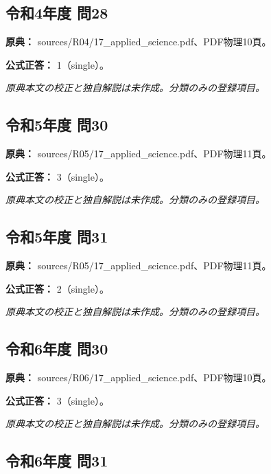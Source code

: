\subsection{令和4年度 問28}
\label{q:r04-reg-applied-28}

\noindent\textbf{原典：} sources/R04/17\_applied\_science.pdf、PDF物理10頁。

\textbf{公式正答：} 1（single）。

\par\textit{原典本文の校正と独自解説は未作成。分類のみの登録項目。}

\subsection{令和5年度 問30}
\label{q:r05-reg-applied-30}

\noindent\textbf{原典：} sources/R05/17\_applied\_science.pdf、PDF物理11頁。

\textbf{公式正答：} 3（single）。

\par\textit{原典本文の校正と独自解説は未作成。分類のみの登録項目。}

\subsection{令和5年度 問31}
\label{q:r05-reg-applied-31}

\noindent\textbf{原典：} sources/R05/17\_applied\_science.pdf、PDF物理11頁。

\textbf{公式正答：} 2（single）。

\par\textit{原典本文の校正と独自解説は未作成。分類のみの登録項目。}

\subsection{令和6年度 問30}
\label{q:r06-reg-applied-30}

\noindent\textbf{原典：} sources/R06/17\_applied\_science.pdf、PDF物理10頁。

\textbf{公式正答：} 3（single）。

\par\textit{原典本文の校正と独自解説は未作成。分類のみの登録項目。}

\subsection{令和6年度 問31}
\label{q:r06-reg-applied-31}

